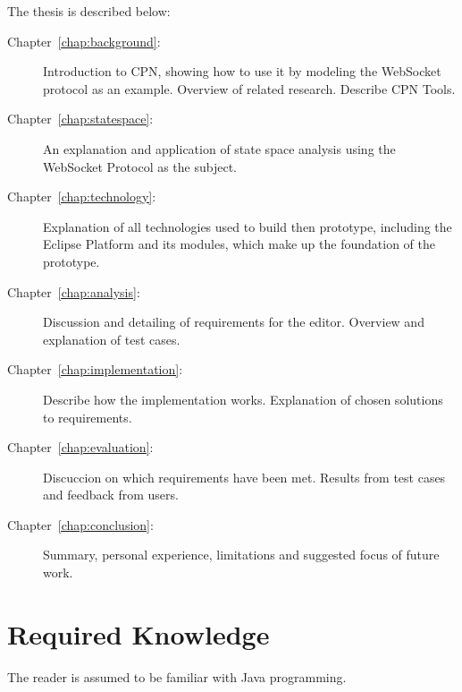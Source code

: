 The thesis is described below:

\begin{description}
\item[Chapter~\ref{chap:background}:~] Introduction to
CPN, showing how to use it by modeling the WebSocket protocol as an example.
Overview of related research. Describe CPN Tools.
\item[Chapter~\ref{chap:statespace}:~] An explanation
and application of state space analysis using the WebSocket Protocol as the
subject.
\item [Chapter~\ref{chap:technology}:~] Explanation of
all technologies used to build then prototype, including the Eclipse Platform
and its modules, which make up the foundation of the prototype.
\item [Chapter~\ref{chap:analysis}:~] Discussion and
detailing of requirements for the editor. Overview and explanation of test cases.
\item [Chapter~\ref{chap:implementation}:~]
Describe how the implementation works. Explanation of chosen solutions to requirements. 
\item [Chapter~\ref{chap:evaluation}:~] Discuccion on
which requirements have been met. Results from test cases and feedback from
users.
\item [Chapter~\ref{chap:conclusion}:~] Summary,
personal experience, limitations and suggested focus of future work.
\end{description} 

\section{Required Knowledge}

The reader is assumed to be familiar with Java programming.